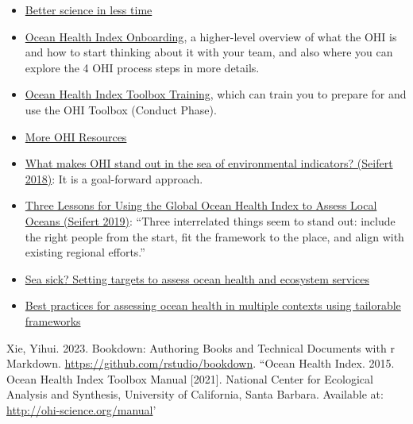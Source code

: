 \documentclass[
]{book}
\begin{document}
\begin{itemize}
\item
  \href{https://www.nature.com/articles/s41559-017-0160}{Better science in less time}
\item
  \href{http://ohi-science.org/onboarding/}{Ocean Health Index Onboarding}, a higher-level overview of what the OHI is and how to start thinking about it with your team, and also where you can explore the 4 OHI process steps in more details.
\item
  \href{https://ohi-science.org/toolbox-training/index.html}{Ocean Health Index Toolbox Training}, which can train you to prepare for and use the OHI Toolbox (Conduct Phase).
\item
  \href{https://oceanhealthindex.org/resources/tools/}{More OHI Resources}
\item
  \href{https://ohi-science.org/news/goal-forward-approach}{What makes OHI stand out in the sea of environmental indicators? (Seifert 2018)}: It is a goal-forward approach.
\item
  \href{https://ohi-science.org/news/three-lessons-global}{Three Lessons for Using the Global Ocean Health Index to Assess Local Oceans (Seifert 2019)}: ``Three interrelated things seem to stand out: include the right people from the start, fit the framework to the place, and align with existing regional efforts.''
\item
  \href{https://esajournals.onlinelibrary.wiley.com/doi/full/10.1890/ES11-00366.1}{Sea sick? Setting targets to assess ocean health and ecosystem services}
\item
  \href{https://peerj.com/articles/1503/}{Best practices for assessing ocean health in multiple contexts using tailorable frameworks}
\end{itemize}

Xie, Yihui. 2023. Bookdown: Authoring Books and Technical Documents with r Markdown. \url{https://github.com/rstudio/bookdown}.
``Ocean Health Index. 2015. Ocean Health Index Toolbox Manual {[}2021{]}. National Center for Ecological Analysis and Synthesis, University of California, Santa Barbara. Available at: \url{http://ohi-science.org/manual}'

  
\end{document}
